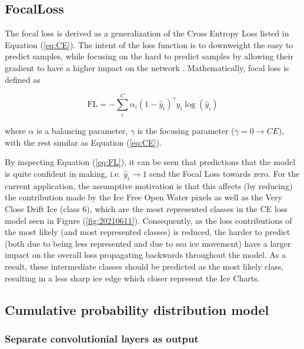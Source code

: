\documentclass[../main/thesis]{subfiles}
\begin{document}
\subsection{FocalLoss}
The focal loss is derived as a generalization of the Cross Entropy Loss listed in Equation (\ref{eq:CE}). The intent of the loss function is to downweight the easy to predict samples, while focusing on the hard to predict samples by allowing their gradient to have a higher impact on the network \cite{Lin2017}. Mathematically, focal loss is defined as

\begin{equation}
    \label{eq:FL}
    \text{FL} = -\sum_i^C\alpha_i(1 - \hat{y}_i)^\gamma y_i\log{(\hat{y}_i)}
\end{equation}

where $\alpha$ is a balancing parameter, $\gamma$ is the focusing parameter ($\gamma = 0 \rightarrow CE$), with the rest similar as Equation (\ref{eq:CE}).

By inspecting Equation (\ref{eq:FL}), it can be seen that predictions that the model is quite confident in making, i.e. $\hat{y}_i \rightarrow 1$ send the Focal Loss towards zero. For the current application, the assumptive motivation is that this affects (by reducing) the contribution made by the Ice Free Open Water pixels as well as the Very Close Drift Ice (class 6), which are the most represented classes in the CE loss model seen in Figure (\ref{fig:20210611}). Consequently, as the loss contributions of the most likely (and most represented classes) is reduced, the harder to predict (both due to being less represented and due to sea ice movement) have a larger impact on the overall loss propagating backwards throughout the model. As a result, these intermediate classes should be predicted as the most likely class, resulting in a less sharp ice edge which closer represent the Ice Charts. 


\subsection{Cumulative probability distribution model}

\subsubsection{Separate convolutionial layers as output}
\end{document}
